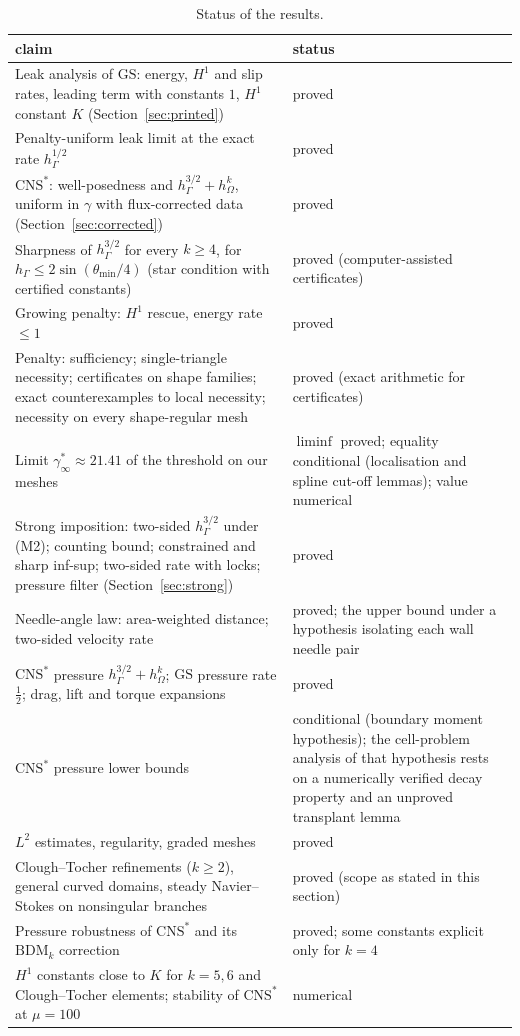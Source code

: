 \documentclass[pdflatex,sn-mathphys-num]{sn-jnl}
\theoremstyle{thmstyleone}
\theoremstyle{thmstylethree}
\newcommand{\hG}{h_\Gamma}
\newcommand{\hO}{h_\Omega}
\newcommand{\GS}{\mathrm{GS}}
\newcommand{\CNS}{\mathrm{CNS}^\ast}
\begin{document}
\begin{table}[t]
\centering\small
\caption{Status of the results.}\label{tab:status}
\begin{tabular}{p{}p{}}
\toprule
claim & status\\
\midrule
Leak analysis of $\GS$: energy, $H^1$ and slip rates, leading term with constants $1$, $H^1$ constant $K$ (Section~\ref{sec:printed}) & proved\\
Penalty-uniform leak limit at the exact rate $\hG^{1/2}$ & proved\\
$\CNS$: well-posedness and $\hG^{3/2}+\hO^k$, uniform in $\gamma$ with flux-corrected data (Section~\ref{sec:corrected}) & proved\\
Sharpness of $\hG^{3/2}$ for every $k\ge4$, for $\hG\le2\sin(\theta_{\min}/4)$ (star condition with certified constants) & proved (computer-assisted certificates)\\
Growing penalty: $H^1$ rescue, energy rate $\le1$ & proved\\
Penalty: sufficiency; single-triangle necessity; certificates on shape families; exact counterexamples to local necessity; necessity on every shape-regular mesh & proved (exact arithmetic for certificates)\\
Limit $\gamma^\ast_\infty\approx21.41$ of the threshold on our meshes & $\liminf$ proved; equality conditional (localisation and spline cut-off lemmas); value numerical\\
Strong imposition: two-sided $\hG^{3/2}$ under (M2); counting bound; constrained and sharp inf-sup; two-sided rate with locks; pressure filter (Section~\ref{sec:strong}) & proved\\
Needle-angle law: area-weighted distance; two-sided velocity rate & proved; the upper bound under a hypothesis isolating each wall needle pair\\
$\CNS$ pressure $\hG^{3/2}+\hO^k$; $\GS$ pressure rate $\frac12$; drag, lift and torque expansions & proved\\
$\CNS$ pressure lower bounds & conditional (boundary moment hypothesis); the cell-problem analysis of that hypothesis rests on a numerically verified decay property and an unproved transplant lemma\\
$L^2$ estimates, regularity, graded meshes & proved\\
Clough--Tocher refinements ($k\ge2$), general curved domains, steady Navier--Stokes on nonsingular branches & proved (scope as stated in this section)\\
Pressure robustness of $\CNS$ and its $\mathrm{BDM}_k$ correction & proved; some constants explicit only for $k=4$\\
$H^1$ constants close to $K$ for $k=5,6$ and Clough--Tocher elements; stability of $\CNS$ at $\mu=100$ & numerical\\
\bottomrule
\end{tabular}
\end{table}
\end{document}
